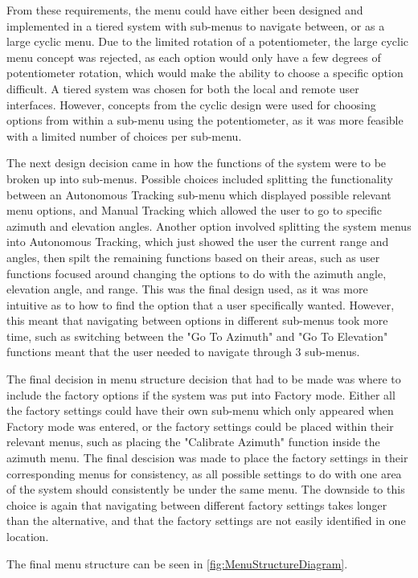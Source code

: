 \documentclass[]{report}
\begin{document}
From these requirements, the menu could have either been designed and implemented in a tiered system with sub-menus to navigate between, or as a large cyclic menu. Due to the limited rotation of a potentiometer, the large cyclic menu concept was rejected, as each option would only have a few degrees of potentiometer rotation, which would make the ability to choose a specific option difficult. A tiered system was chosen for both the local and remote user interfaces. However, concepts from the cyclic design were used for choosing options from within a sub-menu using the potentiometer, as it was more feasible with a limited number of choices per sub-menu. 


The next design decision came in how the functions of the system were to be broken up into sub-menus. Possible choices included splitting the functionality between an Autonomous Tracking sub-menu which displayed possible relevant menu options, and Manual Tracking which allowed the user to go to specific azimuth and elevation angles. Another option involved splitting the system menus into Autonomous Tracking, which just showed the user the current range and angles, then spilt the remaining functions based on their areas, such as user functions focused around changing the options to do with the azimuth angle, elevation angle, and range. This was the final design used, as it was more intuitive as to how to find the option that a user specifically wanted. However, this meant that navigating between options in different sub-menus took more time, such as switching between the "Go To Azimuth" and "Go To Elevation" functions meant that the user needed to navigate through 3 sub-menus.


The final decision in menu structure decision that had to be made was where to include the factory options if the system was put into Factory mode. Either all the factory settings could have their own sub-menu which only appeared when Factory mode was entered, or the factory settings could be placed within their relevant menus, such as placing the "Calibrate Azimuth" function inside the azimuth menu. The final descision was made to place the factory settings in their corresponding menus for consistency, as all possible settings to do with one area of the system should consistently be under the same menu. The downside to this choice is again that navigating between different factory settings takes longer than the alternative, and that the factory settings are not easily identified in one location. 


The final menu structure can be seen in \ref{fig:MenuStructureDiagram}.
\end{document}
